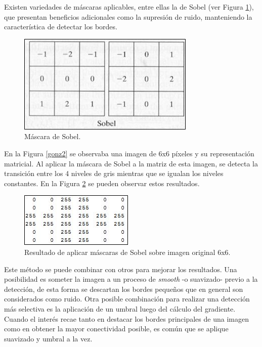 Existen variedades de máscaras aplicables, entre ellas la de Sobel (ver Figura \ref{gonz5}), que presentan beneficios adicionales como la supresión de ruido, manteniendo la característica de detectar los bordes.

\begin{figure}[H]
\begin{center}
\includegraphics[scale=0.6]{img/08_matriz_sobel.jpg}
\end{center}
\caption{Máscara de Sobel.}
\label{gonz5}
\end{figure}

En la Figura \ref{gonz2} se observaba una imagen de 6x6 píxeles y su representación matricial. Al aplicar la máscara de Sobel a la matriz de esta imagen, se detecta la transición entre los 4 niveles de gris mientras que se igualan los niveles constantes. En la Figura \ref{gonz6} se pueden observar estos resultados.

\begin{figure}[H]
\begin{center}
\includegraphics[scale=0.8]{img/09_escala_grises_deteccion_borde.jpg}
\end{center}
\caption{Resultado de aplicar máscaras de Sobel sobre imagen original 6x6.}
\label{gonz6}
\end{figure}

 Este método se puede combinar con otros para mejorar los resultados. Una posibilidad es someter la imagen a un proceso de \textit{smooth} \cite{smooth} -o suavizado- previo a la detección, de esta forma se descartan los bordes pequeños que en general son considerados como ruido. Otra posible combinación para realizar una detección más selectiva es la aplicación de un umbral luego del cálculo del gradiente. Cuando el interés recae tanto en destacar los bordes principales de una imagen como en obtener la mayor conectividad posible, es común que se aplique suavizado y umbral a la vez.

